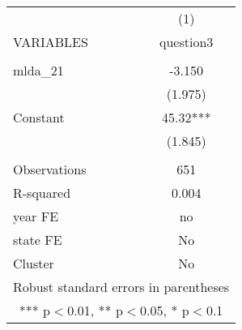 \documentclass[]{article}
\begin{document}
\begin{tabular}{lc} \hline
 & (1) \\
VARIABLES & question3 \\ \hline
 &  \\
mlda\_21 & -3.150 \\
 & (1.975) \\
Constant & 45.32*** \\
 & (1.845) \\
 &  \\
Observations & 651 \\
R-squared & 0.004 \\
year FE & no \\
state FE & No \\
 Cluster & No \\ \hline
\multicolumn{2}{c}{ Robust standard errors in parentheses} \\
\multicolumn{2}{c}{ *** p$<$0.01, ** p$<$0.05, * p$<$0.1} \\
\end{tabular}
\end{document}
